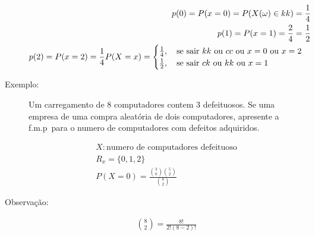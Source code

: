 \documentclass[11pt,a4paper]{book}
\begin{document}
\begin{description}
       \begin{align*}
         p(0)=P(x=0)=P(X(\omega)\in kk)=\frac{1}{4} \\
         p(1)=P(x=1)=\frac{2}{4}=\frac{1}{2}\\
         p(2)=P(x=2)=\frac{1}{4}
         P(X=x)= \begin{cases}
           \frac{1}{4}, \text{\quad se sair $kk$ ou $cc$ ou $x=0$ ou $x=2$}\\
           \frac{1}{2}, \text{\quad se sair $ck$ ou $kk$ ou $x=1$ }
         \end{cases}
       \end{align*}

     \item [Exemplo:] Um carregamento de 8 computadores contem 3 defeituosos. Se uma empresa de uma compra aleatória de dois computadores, apresente a f.m.p\ para o numero de computadores com defeitos adquiridos.

       \begin{align*}   X: \text{numero de computadores defeituoso}\\
         R_x = \{0,1,2\} \\
         P(X=0) = \frac{ \binom{3}{0} \binom{5}{2} }{ \binom{8}{2} }
       \end{align*}

     \item [Observação:]
       \begin{align*}
         \binom{8}{2} = \frac{8!}{2!\left( 8-2 \right)!}
       \end{align*} 


\end{description}
\end{document}
